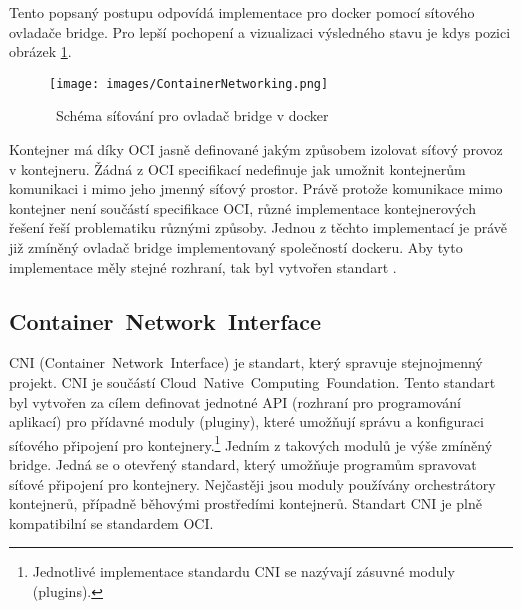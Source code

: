 

Tento popsaný postupu odpovídá implementace pro docker pomocí sítového ovladače bridge. Pro lepší pochopení a vizualizaci výsledného stavu je kdys pozici obrázek \ref{img:ContainerNetworking}.\\

\begin{figure}[ht]
\centering
\texttt{[image: images/ContainerNetworking.png]}
\caption{~Schéma síťování pro ovladač bridge v docker}\label{img:ContainerNetworking}
\cite{velichko_2020_connecting}
\end{figure}

Kontejner má díky OCI jasně definované jakým způsobem izolovat síťový provoz v kontejneru. Žádná z OCI specifikací nedefinuje jak umožnit kontejnerům komunikaci i mimo jeho jmenný síťový prostor. Právě protože komunikace mimo kontejner není součástí specifikace OCI, různé implementace kontejnerových řešení řeší problematiku různými způsoby. Jednou z těchto implementací je právě již zmíněný ovladač bridge implementovaný společností dockeru. Aby tyto implementace měly stejné rozhraní, tak byl vytvořen standart .

\subsection{Container~Network~Interface}\label{cni}
CNI (Container~Network~Interface) je standart, který spravuje stejnojmenný projekt. CNI je součástí Cloud~Native~Computing~Foundation. Tento standart byl vytvořen za cílem definovat jednotné API (rozhraní pro programování aplikací) pro přídavné moduly (pluginy), které umožňují správu a konfiguraci síťového připojení pro kontejnery.\footnote{Jednotlivé implementace standardu CNI se nazývají zásuvné moduly (plugins).} Jedním z takových modulů je výše zmíněný bridge. Jedná se o otevřený standard, který umožňuje programům spravovat síťové připojení pro kontejnery. Nejčastěji jsou moduly používány orchestrátory kontejnerů, případně běhovými prostředími kontejnerů. Standart CNI je plně kompatibilní se standardem OCI.


